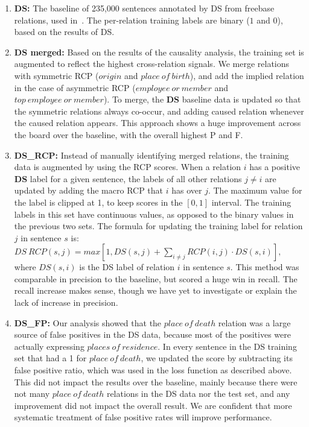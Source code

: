 \begin{enumerate}

\item \textbf{DS:} The baseline of 235,000 sentences annotated by DS from freebase relations, used in~\citet{riedel2013relation}. The per-relation training labels are binary ($1$ and $0$), based on the results of DS.

\item \textbf{DS merged:} Based on the results of the causality analysis, the training set is augmented to reflect the highest cross-relation signals.  We merge relations with symmetric RCP ($origin$ and $place\ of\ birth$), and add the implied relation in the case of asymmetric RCP ($employee\ or\ member$  and $top\ employee\ or\ member$). To merge, the \textbf{DS} baseline data is updated so that the symmetric relations always co-occur, and adding caused relation whenever the caused relation appears. This approach shows a huge improvement across the board over the baseline, with the overall highest P and F.

\item \textbf{DS\_RCP:} Instead of manually identifying merged relations, the training data is augmented by using the RCP scores. When a relation $i$ has a positive \textbf{DS} label for a given sentence, the labels of all other relations $j \neq i$ are updated by adding the macro RCP that $i$ has over $j$. The maximum value for the label is clipped at 1, to keep scores in the $[0,1]$ interval. The training labels in this set have continuous values, as opposed to the binary values in the previous two sets. The formula for updating the training label for relation $j$ in sentence $s$ is: $ DS\ RCP(s, j) = max[1, DS(s, j) + \sum_{i \neq j} RCP(i,j) \cdot DS(s,i) ],$ where $DS(s,i)$ is the DS label of relation $i$ in sentence $s$.  This method was comparable in precision to the baseline, but scored a huge win in recall.  The recall increase makes sense, though we have yet to investigate or explain the lack of increase in precision.

\item \textbf{DS\_FP:} Our analysis showed that the $place\ of\ death$ relation was a large source of false positives in the DS data, because most of the positives were actually expressing $places\ of\ residence$.  In every sentence in the DS training set that had a 1 for $place\ of\ death$, we updated the score by subtracting its false positive ratio, which was used in the loss function as described above.  This did not impact the results over the baseline, mainly because there were not many $place\ of\ death$ relations in the DS data nor the test set, and any improvement did not impact the overall result.  We are confident that more systematic treatment of false positive rates will improve performance.

\end{enumerate}

